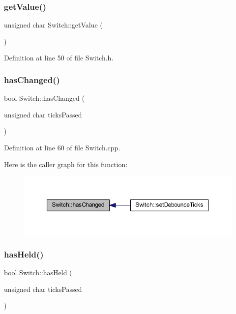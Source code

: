 \subsubsection{\texorpdfstring{get\+Value()}{getValue()}}
{\footnotesize\ttfamily unsigned char Switch\+::get\+Value (\begin{DoxyParamCaption}{ }\end{DoxyParamCaption})\hspace{0.3cm}{\ttfamily [inline]}}



Definition at line 50 of file Switch.\+h.

\mbox{\label{class_switch_a723c543e4e77a985ce0cdf195f6882ab}} 
\subsubsection{\texorpdfstring{has\+Changed()}{hasChanged()}}
{\footnotesize\ttfamily bool Switch\+::has\+Changed (\begin{DoxyParamCaption}\item[{unsigned char}]{ticks\+Passed }\end{DoxyParamCaption})}



Definition at line 60 of file Switch.\+cpp.

Here is the caller graph for this function\+:
\nopagebreak
\begin{figure}[H]
\begin{center}
\leavevmode
\includegraphics[width=350pt]{class_switch_a723c543e4e77a985ce0cdf195f6882ab_icgraph}
\end{center}
\end{figure}
\mbox{\label{class_switch_a6cb0b78f23c412042b31ce8af317c718}} 
\subsubsection{\texorpdfstring{has\+Held()}{hasHeld()}}
{\footnotesize\ttfamily bool Switch\+::has\+Held (\begin{DoxyParamCaption}\item[{unsigned char}]{ticks\+Passed }\end{DoxyParamCaption})}



